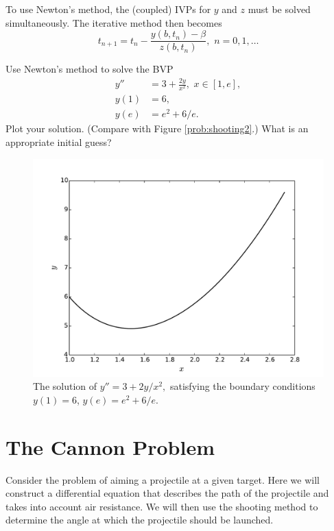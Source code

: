 To use Newton's method, the (coupled) IVPs for $y$ and $z$ must be solved simultaneously.
The iterative method then becomes 
\[t_{n+1} = t_n - \frac{ y(b,t_n) - \beta}{z(b,t_n)}, \,\, n = 0,1,\hdots\]

\begin{problem}
Use Newton's method to solve the BVP
\begin{equation*}
\begin{split}
y'' &= 3 + \frac{2y}{x^2}, \,\, x \in [1,e],\\
y(1) &= 6, \\
y(e) &= e^2 + 6/e.
\end{split}
\end{equation*}
Plot your solution.
(Compare with Figure \eqref{prob:shooting2}.)
What is an appropriate initial guess? 
\end{problem}

\begin{figure}[ht]
\centering
\includegraphics[width=\textwidth]{Fig2.pdf}
\caption{The solution of  $y'' = 3 + 2y/x^2,$ satisfying the boundary conditions $y(1) = 6$, $ y(e) =  e^2 + 6/e$.}
\label{prob:shooting2}
\end{figure}

\section*{The Cannon Problem}

Consider the problem of aiming a projectile at a given target.
Here we will construct a differential equation that describes the path of the projectile and takes into account air resistance.
We will then use the shooting method to determine the angle at which the projectile should be launched. 

